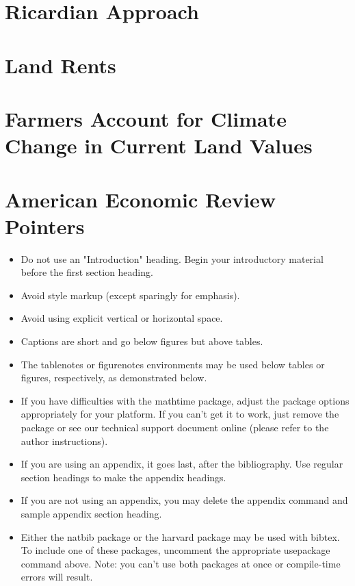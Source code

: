 \documentclass[AER]{AEA}
\begin{document}
\section{Ricardian Approach}\label{ricardian-approach}

\section{Land Rents}\label{land-rents}

\section{Farmers Account for Climate Change in Current Land
Values}\label{farmers-account-for-climate-change-in-current-land-values}

\section{American Economic Review
Pointers}\label{american-economic-review-pointers}

\begin{itemize}
\item Do not use an "Introduction" heading. Begin your introductory material
before the first section heading.

\item Avoid style markup (except sparingly for emphasis).

\item Avoid using explicit vertical or horizontal space.

\item Captions are short and go below figures but above tables.

\item The tablenotes or figurenotes environments may be used below tables
or figures, respectively, as demonstrated below.

\item If you have difficulties with the mathtime package, adjust the package
options appropriately for your platform. If you can't get it to work, just
remove the package or see our technical support document online (please
refer to the author instructions).

\item If you are using an appendix, it goes last, after the bibliography.
Use regular section headings to make the appendix headings.

\item If you are not using an appendix, you may delete the appendix command
and sample appendix section heading.

\item Either the natbib package or the harvard package may be used with bibtex.
To include one of these packages, uncomment the appropriate usepackage command
above. Note: you can't use both packages at once or compile-time errors will result.

\end{itemize}
\end{document}

